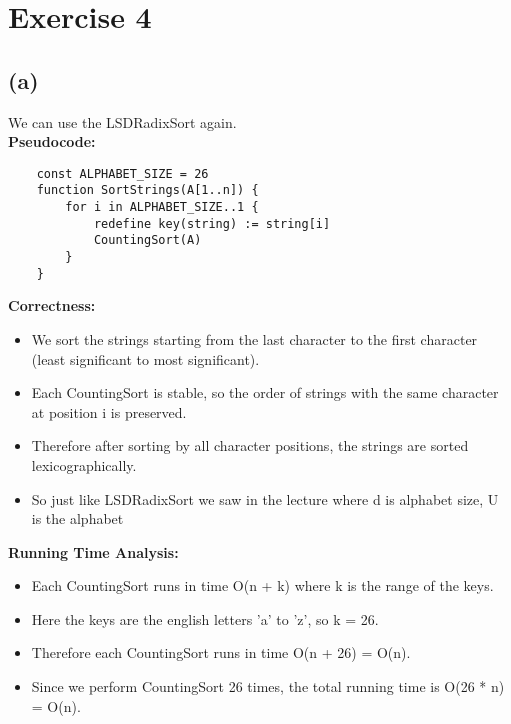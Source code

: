 \documentclass{article}
\begin{document}
\section*{Exercise 4}
\subsection*{(a)}
We can use the LSDRadixSort again. \\
\textbf{Pseudocode:}
\begin{verbatim}
    const ALPHABET_SIZE = 26
    function SortStrings(A[1..n]) {
        for i in ALPHABET_SIZE..1 {
            redefine key(string) := string[i]
            CountingSort(A)
        }
    }
\end{verbatim}

\textbf{Correctness:}
\begin{itemize}
    \item We sort the strings starting from the last character to the first character (least significant to most significant).
    \item Each CountingSort is stable, so the order of strings with the same character at position i is preserved.
    \item Therefore after sorting by all character positions, the strings are sorted lexicographically.
    \item So just like LSDRadixSort we saw in the lecture where d is alphabet size, U is the alphabet
\end{itemize}

\textbf{Running Time Analysis:}
\begin{itemize}
    \item Each CountingSort runs in time O(n + k) where k is the range of the keys.
    \item Here the keys are the english letters 'a' to 'z', so k = 26.
    \item Therefore each CountingSort runs in time O(n + 26) = O(n).
    \item Since we perform CountingSort 26 times, the total running time is O(26 * n) = O(n).
\end{itemize}
\end{document}

